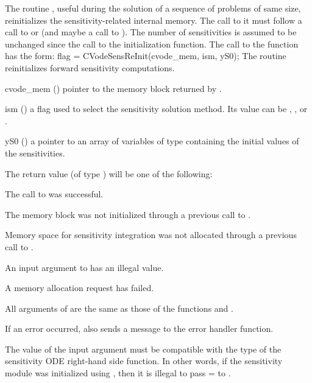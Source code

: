 The routine , useful during the solution of a
sequence of problems of same size, reinitializes the
sensitivity-related internal memory. The call to it must follow a call
to  or  (and maybe a call to
).  The number  of sensitivities is assumed to
be unchanged since the call to the initialization function.
The call to the  function has the form:
{
  flag = CVodeSensReInit(cvode\_mem, ism, yS0);
}
{
  The routine  reinitializes forward sensitivity computations.
}
{
  \begin{args}

  \item[cvode\_mem] ()
    pointer to the {\cvodes} memory block returned by .

  \item[ism] ()
    a flag used to select the sensitivity solution method.  Its value can 
    be , , or .

  \item[yS0] () 
    a pointer to an array of  variables of type  containing the 
    initial values of the sensitivities.

  \end{args}
}
{
  The return value  (of type ) will be one of the following:
  \begin{args}
  \item[\Id{CV\_SUCCESS}]
    The call to  was successful.
  \item[\Id{CV\_MEM\_NULL}] 
    The {\cvodes} memory block was not initialized through a 
    previous call to .
  \item[\Id{CV\_NO\_SENS}]
    Memory space for sensitivity integration was not allocated through a 
    previous call to .
  \item[\Id{CV\_ILL\_INPUT}] 
    An input argument to  has an illegal value.    
  \item[\Id{CV\_MEM\_FAIL}] 
    A memory allocation request has failed.
  \end{args}
}
{
  All arguments of  are the same as those of the functions
   and .

  If an error occurred,  also sends a message to the
  error handler function.

  {\warn}The value of the input argument  must be compatible with
  the type of the sensitivity ODE right-hand side function. In other words,
  if the sensitivity module was initialized using , then
  it is illegal to pass = to .
}
